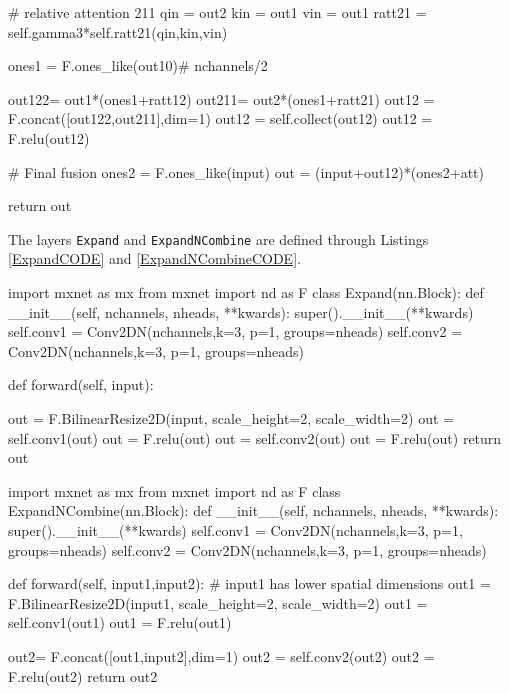 \documentclass[times, 5p]{elsarticle}
\newcommand{\ceecnet}{\texttt{CEECNet}}
\begin{document}
\begin{python}[caption={\textsc{mxnet/gluon} style pseudocode for the \ceecnet V1 unit.},
emph={CEECNet_unit_V1,forward,__init__},emphstyle=\textcolor{magenta},label={CEECNetUnitCODE}]
        # relative attention 211
        qin   = out2
        kin   = out1
        vin   = out1	
        ratt21 = self.gamma3*self.ratt21(qin,kin,vin)      
    
    	ones1 = F.ones_like(out10)# nchannels/2
    
    	out122= out1*(ones1+ratt12)
    	out211= out2*(ones1+ratt21)
        out12 = F.concat([out122,out211],dim=1)
        out12 = self.collect(out12)
        out12 = F.relu(out12)
		
        # Final fusion
        ones2 = F.ones_like(input)
        out   = (input+out12)*(ones2+att)
		
        return out 
\end{python}

The layers \texttt{Expand} and \texttt{ExpandNCombine} are defined through Listings \ref{ExpandCODE} and \ref{ExpandNCombineCODE}. 

\begin{python}[caption={\textsc{mxnet/gluon} style pseudocode for the \texttt{Expand} layer used in the \ceecnet V1 unit.},
emph={Expand,forward,__init__},emphstyle=\textcolor{magenta},label={ExpandCODE}]
import mxnet as mx
from mxnet import nd as F
class Expand(nn.Block):
    def __init__(self, nchannels, nheads, **kwards):
        super().__init__(**kwards)
        self.conv1 = Conv2DN(nchannels,k=3, p=1,
                          groups=nheads)
        self.conv2 = Conv2DN(nchannels,k=3, p=1,
                          groups=nheads)

    def forward(self, input):
       
        out = F.BilinearResize2D(input,
                 scale_height=2,
                 scale_width=2)    
        out = self.conv1(out)
        out = F.relu(out)
        out = self.conv2(out)
        out = F.relu(out)
        return out 
\end{python}



\begin{python}[caption={\textsc{mxnet/gluon} style pseudocode for the \texttt{ExpandNCombine} layer used in the \ceecnet V1 unit.},
emph={ExpandNCombine,forward,__init__},emphstyle=\textcolor{magenta},label={ExpandNCombineCODE}]
import mxnet as mx
from mxnet import nd as F
class ExpandNCombine(nn.Block):
    def __init__(self, nchannels, nheads, **kwards):
        super().__init__(**kwards)
        self.conv1 = Conv2DN(nchannels,k=3, p=1,
                          groups=nheads)
        self.conv2 = Conv2DN(nchannels,k=3, p=1,
                          groups=nheads)

    def forward(self, input1,input2):
        # input1 has lower spatial dimensions
        out1 = F.BilinearResize2D(input1,
                 scale_height=2,
                 scale_width=2)    
        out1 = self.conv1(out1)
        out1 = F.relu(out1)
        
        out2= F.concat([out1,input2],dim=1)
        out2 = self.conv2(out2)
        out2 = F.relu(out2)
        return out2 
\end{python}
\end{document}
